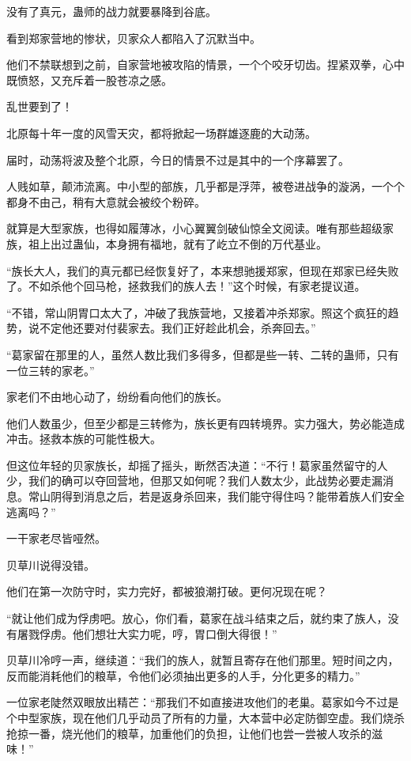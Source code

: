 \begin{this_body}
没有了真元，蛊师的战力就要暴降到谷底。

看到郑家营地的惨状，贝家众人都陷入了沉默当中。

他们不禁联想到之前，自家营地被攻陷的情景，一个个咬牙切齿。捏紧双拳，心中既愤怒，又充斥着一股苍凉之感。

乱世要到了！

北原每十年一度的风雪天灾，都将掀起一场群雄逐鹿的大动荡。

届时，动荡将波及整个北原，今日的情景不过是其中的一个序幕罢了。

人贱如草，颠沛流离。中小型的部族，几乎都是浮萍，被卷进战争的漩涡，一个个都身不由己，稍有大意就会被绞个粉碎。

就算是大型家族，也得如履薄冰，小心翼翼剑破仙惊全文阅读。唯有那些超级家族，祖上出过蛊仙，本身拥有福地，就有了屹立不倒的万代基业。

“族长大人，我们的真元都已经恢复好了，本来想驰援郑家，但现在郑家已经失败了。不如杀他个回马枪，拯救我们的族人去！”这个时候，有家老提议道。

“不错，常山阴胃口太大了，冲破了我族营地，又接着冲杀郑家。照这个疯狂的趋势，说不定他还要对付裴家去。我们正好趁此机会，杀奔回去。”

“葛家留在那里的人，虽然人数比我们多得多，但都是些一转、二转的蛊师，只有一位三转的家老。”

家老们不由地心动了，纷纷看向他们的族长。

他们人数虽少，但至少都是三转修为，族长更有四转境界。实力强大，势必能造成冲击。拯救本族的可能性极大。

但这位年轻的贝家族长，却摇了摇头，断然否决道：“不行！葛家虽然留守的人少，我们的确可以夺回营地，但那又如何呢？我们人数太少，此战势必要走漏消息。常山阴得到消息之后，若是返身杀回来，我们能守得住吗？能带着族人们安全逃离吗？”

一干家老尽皆哑然。

贝草川说得没错。

他们在第一次防守时，实力完好，都被狼潮打破。更何况现在呢？

“就让他们成为俘虏吧。放心，你们看，葛家在战斗结束之后，就约束了族人，没有屠戮俘虏。他们想壮大实力呢，哼，胃口倒大得很！”

贝草川冷哼一声，继续道：“我们的族人，就暂且寄存在他们那里。短时间之内，反而能消耗他们的粮草，令他们必须抽出更多的人手，分化更多的精力。”

一位家老陡然双眼放出精芒：“那我们不如直接进攻他们的老巢。葛家如今不过是个中型家族，现在他们几乎动员了所有的力量，大本营中必定防御空虚。我们烧杀抢掠一番，烧光他们的粮草，加重他们的负担，让他们也尝一尝被人攻杀的滋味！”


\end{this_body}

